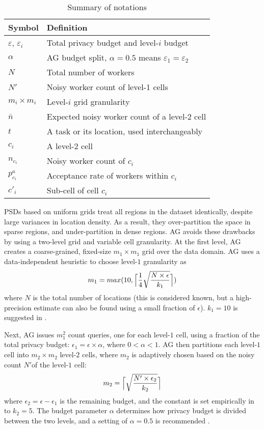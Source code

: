 \documentclass{USC-Thesis}
\renewcommand\bf\bfseries  %
\newcommand{\tn}{\tabularnewline}
\DeclarePairedDelimiter{\ceil}{\lceil}{\rceil}
\numberwithin{equation}{chapter}
\begin{document}
\begin{table}
\begin{center}
\footnotesize
\begin{tabular}{ l | l}
\hline
{\bf Symbol} & {\bf Definition} \tn
\hline
$\varepsilon$, $\varepsilon_i$ & Total privacy budget and level-$i$ budget \tn
\hline
$\alpha$ & AG budget split, $\alpha=0.5$ means $\varepsilon_1=\varepsilon_2$  \tn
\hline
$N$ & Total number of workers \tn
\hline
$N'$ & Noisy worker count of level-1 cells \tn
\hline
$m_i\times m_i$ & Level-$i$ grid granularity \tn
\hline
$\bar{n}$ & Expected noisy worker count of a level-2 cell \tn
\hline
$t$ & A task or its location, used interchangeably \tn
\hline
$c_i$ & A level-2 cell \tn
\hline
$n_{c_i}$ & Noisy worker count of $c_i$ \tn
\hline
$p^a_{c_i}$ & Acceptance rate of workers within $c_i$ \tn
\hline
$c'_i$ & Sub-cell of cell $c_i$ \tn
\hline
\end{tabular}
\caption{Summary of notations}
\label{tab:notation1}
\end{center}
\end{table}

PSDs based on uniform grids treat all regions in the dataset identically, despite large variances in location density. As a result, they over-partition the space in sparse regions, and under-partition in dense regions. AG avoids these drawbacks by using a two-level grid and variable cell granularity. At the first level, AG creates a coarse-grained, fixed-size $m_1\times m_1$ grid over the data domain. AG uses a data-independent heuristic to choose level-$1$ granularity as
$$m_1=max(10,\ceil[\Big]{ \frac{1}{4}\sqrt{\frac{N \times \epsilon}{k_1}} })$$
where $N$ is the total number of locations (this is considered known, but a high-precision estimate can also be found using a small fraction of $\epsilon$). $k_1=10$ is suggested in \cite{qardaji2012differentially}.

Next, AG issues $m_1^2$ count queries, one for each level-$1$ cell, using a fraction of the total privacy budget: $\epsilon_1 = \epsilon \times \alpha$, where $0<\alpha<1$. AG then partitions each level-$1$ cell into $m_2\times m_2$ level-$2$ cells, where $m_2$ is adaptively chosen based on the noisy count $N'$of the level-$1$ cell:
\begin{equation}
m_2=\ceil[\Big] {\sqrt{{\frac{N' \times \epsilon_2}{k_2}}}}
\label{eq:m2}
\end{equation}
where $\epsilon_2 = \epsilon - \epsilon_1$ is the remaining budget, and the constant is set empirically in \cite{qardaji2012differentially} to $k_2=5$. The budget parameter $\alpha$ determines how privacy budget is divided between the two levels, and a setting of  $\alpha = 0.5$ is recommended \cite{qardaji2012differentially}.
\end{document}
